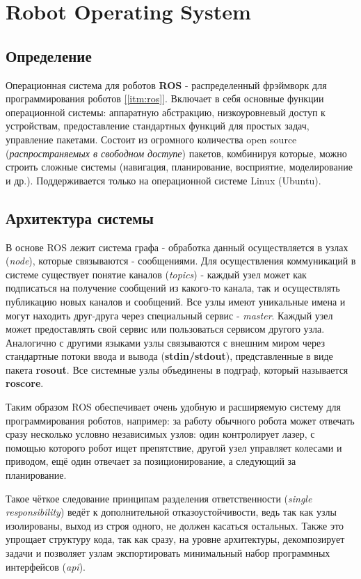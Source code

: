 \chapter{Robot Operating System}

\section{Определение}

Операционная система для роботов \textbf{ROS} - распределенный фрэймворк для программирования роботов \hyperref[itm:ros]{[\ref{itm:ros}]}. Включает в себя основные функции операционной системы: аппаратную абстракцию, низкоуровневый доступ к устройствам, предоставление стандартных функций для простых задач, управление пакетами. Состоит из огромного количества open source (\textit{распространяемых в свободном доступе}) пакетов, комбинируя которые, можно строить сложные системы (навигация, планирование, восприятие, моделирование и др.). Поддерживается только на операционной системе Linux (Ubuntu).

\section{Архитектура системы}

В основе ROS лежит система графа - обработка данный осуществляется в узлах (\textit{node}), которые связываются  - сообщениями. Для осуществления коммуникаций в системе существует понятие каналов (\textit{topics}) - каждый узел может как подписаться на получение сообщений из какого-то канала, так и осуществлять публикацию новых каналов и сообщений. Все узлы имеют уникальные имена и могут находить друг-друга через специальный сервис - \textit{master}. Каждый узел может предоставлять свой сервис или пользоваться сервисом другого узла. Аналогично с другими языками узлы связываются с внешним миром через стандартные потоки ввода и вывода (\textbf{stdin/stdout}), представленные в виде пакета \textbf{rosout}. Все системные узлы объединены в подграф, который называется \textbf{roscore}.

Таким образом ROS обеспечивает очень удобную и расширяемую систему для программирования роботов, например: за работу обычного робота может отвечать сразу несколько условно независимых узлов: один контролирует лазер, с помощью которого робот ищет препятствие, другой узел управляет колесами и приводом, ещё один отвечает за позиционирование, а следующий за планирование.

Такое чёткое следование принципам разделения ответственности (\textit{single responsibility}) ведёт к дополнительной отказоустойчивости, ведь так как узлы изолированы, выход из строя одного, не должен касаться остальных. Также это упрощает структуру кода, так как сразу, на уровне архитектуры, декомпозирует задачи и позволяет узлам экспортировать минимальный набор программных интерфейсов (\textit{api}).
